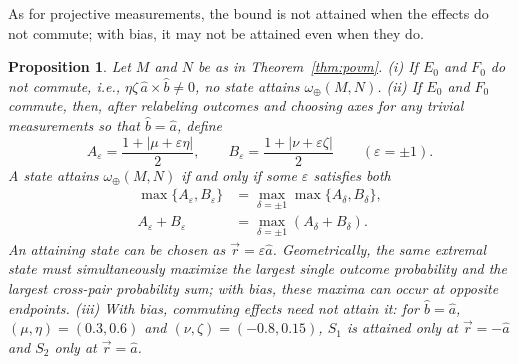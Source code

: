 \documentclass[aps,pra,twocolumn,superscriptaddress,nofootinbib,floatfix]{revtex4-2}
\newtheorem{proposition}{Proposition}
\theoremstyle{definition}
\newcommand{\vecr}{\vec r}
\newcommand{\omplus}{\omega_{\oplus}}
\begin{document}
As for projective measurements, the bound is not attained when the effects do
not commute; with bias, it may not be attained even when they do.

\begin{proposition}
\label{prop:povm-attain}
Let $M$ and $N$ be as in Theorem~\ref{thm:povm}.
(i) If $E_0$ and $F_0$ do not commute, i.e., $\eta\zeta\,\hat a\times\hat b\neq0$,
no state attains $\omplus(M,N)$.
(ii) If $E_0$ and $F_0$ commute, then, after relabeling outcomes and choosing axes
for any trivial measurements so that $\hat b=\hat a$, define
\begin{equation}
  A_\varepsilon=\frac{1+|\mu+\varepsilon\eta|}{2},\qquad
  B_\varepsilon=\frac{1+|\nu+\varepsilon\zeta|}{2}\qquad(\varepsilon=\pm1).
  \label{eq:commuting-endpoints}
\end{equation}
A state attains $\omplus(M,N)$ if and only if some $\varepsilon$ satisfies both
\begin{align}
  \max\{A_\varepsilon,B_\varepsilon\}
  &=\max_{\delta=\pm1}\max\{A_\delta,B_\delta\},\\
  A_\varepsilon+B_\varepsilon
  &=\max_{\delta=\pm1}(A_\delta+B_\delta).
  \label{eq:commuting-attainment}
\end{align}
An attaining state can be chosen as $\vecr=\varepsilon\hat a$. Geometrically, the same
extremal state must simultaneously maximize the largest single outcome
probability and the largest cross-pair probability sum; with bias, these maxima
can occur at opposite endpoints.
(iii) With bias, commuting effects need not attain it: for $\hat b=\hat a$,
$(\mu,\eta)=(0.3,0.6)$ and $(\nu,\zeta)=(-0.8,0.15)$, $S_1$ is attained only at
$\vecr=-\hat a$ and $S_2$ only at $\vecr=\hat a$.
\end{proposition}
\end{document}
